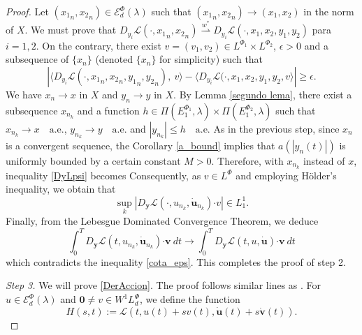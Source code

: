 \documentclass[twoside]{article}
\theoremstyle{remark}
\newcommand{\lphi}{L^{\Phi}}
\newcommand{\lphiuno}{L^{\Phi_1}}
\newcommand{\lphidos}{L^{\Phi_2}}
\newcommand{\lpsii}{L^{\Phie_i}}
\newcommand{\ephiuno}{E^{\Phi_1}}
\newcommand{\ephidos}{E^{\Phi_2}}
\newcommand{\wphi}{W^{1}\lphi}
\newcommand{\domi}{\mathcal{E}^{\Phi}_d(\lambda)}
\renewcommand{\b}[1]{\boldsymbol{#1}}
\newcommand{\ccdot}{\b{\cdot}}
\renewcommand{\leq}{\leqslant}
\renewcommand{\geq}{\geqslant}
\newcommand{\Phie}{\Phi^{*}}
\begin{document}
\begin{proof}
Let $({x_1}_n,{x_2}_n)\in \domi$ such that $({x_1}_n,{x_2}_n)\to (x_1,x_2)$ in the norm of $X$. 
We must prove that  $D_{y_i}\mathcal{L}(\cdot,{x_1}_n,{x_2}_n)\overset{w^*}{\rightharpoonup} 
D_{y_i}\mathcal{L}(\cdot,x_1,x_2,y_1,y_2)$ para $i=1,2$.
On the contrary, there exist $v=(v_1,v_2)\in\lphiuno\times\lphidos$, $\epsilon>0$ and a subsequence of $\{x_n\}$ (denoted  $\{x_n\}$ for simplicity)  such that
\begin{equation}\label{cota_eps}
 \left| \langle D_{y_i}\mathcal{L}(\cdot, {x_1}_n,{x_2}_n,{y_1}_n,{y_2}_n),\
v \rangle - \langle  D_{y_i}\mathcal{L}(\cdot,x_1,x_2, y_1,y_2,v \rangle\right|\geq \epsilon.
\end{equation}
We have $x_n \rightarrow x$ in $X$ and
$y_n\rightarrow y$ in $X$. By Lemma \ref{segundo lema}, 
there exist a subsequence $x_{n_k}$ and a function $h\in \Pi(\ephiuno_1,\lambda)\times\Pi(\ephidos_1,\lambda) $ such that $x_{n_k}\rightarrow x \quad\text{a.e.}$, $y_{n_k}\rightarrow y \quad\text{a.e.}$ and $|y_{n_k}|\leq h\quad\text{a.e.}$ 
As in the previous step, since $x_n$ is a convergent sequence, the Corollary \ref{a_bound} implies that $a(|y_n(t)|)$ is uniformly bounded by a certain constant $M>0$. 
Therefore,  with $x_{n_k}$ instead of $x$, inequality  \eqref{DyLpsi} becomes 
Consequently, as $v \in \lphi$ and employing H\"older's inequality, we obtain that
\[\sup_k|D_{\b{y}}\mathcal{L}(\cdot,u_{n_k},\b{\dot{u}}_{n_k})\ccdot v| \in L^1_1.\]
  Finally, from the Lebesgue Dominated Convergence Theorem, we deduce
\begin{equation}\label{conv_debil}\int_0^T  D_{\b{y}}\mathcal{L}(t,u_{n_k},\b{\dot{u}}_{n_k})\ccdot\b{ v} \ dt \to \int_0^T D_{\b{y}}\mathcal{L}(t,u,\b{\dot{u}})\ccdot\b{ v}\ dt \end{equation}
which contradicts the inequality \eqref{cota_eps}. This completes the proof of step 2.

\emph{Step 3.} We will prove \eqref{DerAccion}. The proof follows similar lines as \cite[Thm. 1.4]{mawhin2010critical}. For $u\in \domi$ and $\b{0}\neq v\in\wphi_d$, we define the function
\[H(s,t):=\mathcal{L}(t,u(t)+sv(t),\b{\dot{u}}(t)+s\b{\dot{v}}(t)).\]


\end{proof}
\end{document}
